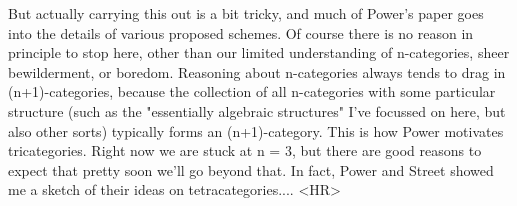 But actually carrying this out is a bit tricky, and much of Power's
paper goes into the details of various proposed schemes.  Of
course there is no reason in principle to stop here, other
than our limited understanding of n-categories, sheer bewilderment,
or boredom.  Reasoning about n-categories always tends to
drag in (n+1)-categories, because the collection of all n-categories with 
some particular structure (such as the "essentially algebraic structures" 
I've focussed on here, but also other sorts) typically forms an 
(n+1)-category.  This is how Power motivates tricategories.  
Right now we are stuck at n = 3, but there are good 
reasons to expect that pretty soon we'll go beyond that.  In fact, 
Power and Street showed me a sketch of their ideas on tetracategories....
<HR>



